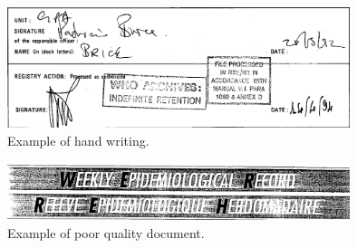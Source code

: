 \documentclass{article}
\begin{document}
\begin{figure}[!ht]
  \includegraphics[width=100mm, scale=0.5]{Signature.png}
  \caption{Example of hand writing.}
  \label{fig:boat2}
\end{figure}

\begin{figure}[!ht]
  \includegraphics[width=100mm, scale=0.5]{PoorQuality.png}
  \caption{Example of poor quality document.}
  \label{fig:boat3}
\end{figure}



\end{document}
